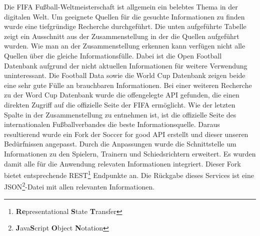 \documentclass[runningheads,a4paper]{llncs}
\begin{document}
Die FIFA Fußball-Weltmeisterschaft ist allgemein ein belebtes Thema in der digitalen Welt. Um geeignete Quellen für die gesuchte Informationen zu finden wurde eine tiefgründige Recherche durchgeführt. Die unten aufgeführte Tabelle zeigt ein Ausschnitt aus der Zusammenstellung in der die Quellen aufgeführt wurden. Wie man an der Zusammenstellung erkennen kann verfügen nicht alle Quellen über die gleiche Informationsfülle. Dabei ist die Open Football Datenbank aufgrund der nicht aktuellen Informationen für weitere Verwendung uninteressant. Die Football Data sowie die World Cup Datenbank zeigen beide eine sehr gute Fülle an brauchbaren Informationen. Bei einer weiteren Recherche zu der Word Cup Datenbank wurde die offengelegte API gefunden, die einen direkten Zugriff auf die offizielle Seite der FIFA ermöglicht. Wie der letzten Spalte in der Zusammenstellung zu entnehmen ist, ist die offizielle Seite des internationalen Fußballverbandes die beste Informationsquelle. 
Daraus resultierend wurde ein Fork der Soccer for good API erstellt und dieser unseren Bedürfnissen angepasst. Durch die Anpassungen wurde die Schnittstelle um Informationen zu den Spielern, Trainern und Schiedsrichtern erweitert. Es wurden damit alle für die Anwendung relevaten Informationen  integriert. Dieser Fork bietet entsprechende REST\footnote{\textbf{Re}presentational \textbf{S}tate \textbf{T}ransfer} Endpunkte an. Die Rückgabe dieses Services ist eine JSON\footnote{\textbf{J}ava\textbf{S}cript \textbf{O}bject \textbf{N}otation}-Datei mit allen relevanten Informationen. \\
\end{document}
